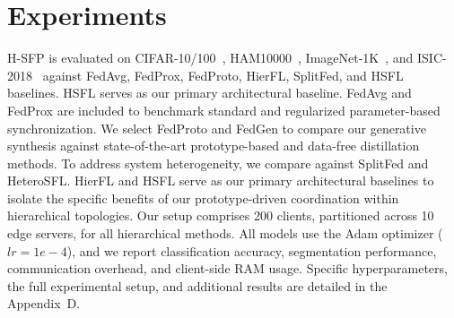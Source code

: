 \section{Experiments}
\label{sec:experiments}
    H-SFP is evaluated on CIFAR-10/100~\cite{krizhevsky2009learning}, HAM10000~\cite{tschandl2018ham10000}, ImageNet-1K~\cite{5206848}, and ISIC-2018~\cite{8363547} against FedAvg, FedProx, FedProto, HierFL, SplitFed, and HSFL baselines. HSFL serves as our primary architectural baseline. FedAvg and FedProx are included to benchmark standard and regularized parameter-based synchronization. We select FedProto and FedGen to compare our generative synthesis against state-of-the-art prototype-based and data-free distillation methods. To address system heterogeneity, we compare against SplitFed and HeteroSFL. HierFL and HSFL serve as our primary architectural baselines to isolate the specific benefits of our prototype-driven coordination within hierarchical topologies. Our setup comprises 200 clients, partitioned across 10 edge servers, for all hierarchical methods. All models use the Adam optimizer ($lr=1e-4$), and we report classification accuracy, segmentation performance, communication overhead, and client-side RAM usage. Specific hyperparameters, the full experimental setup, and additional results are detailed in the Appendix~D.


